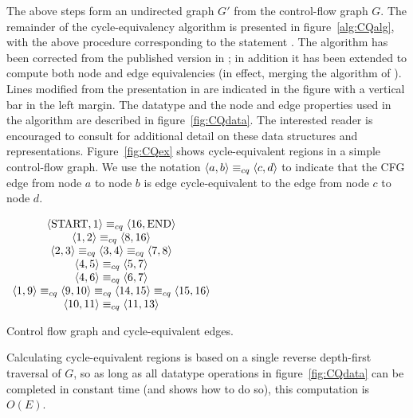\documentclass[12pt,titlepage,twoside]{article}
\begin{document}
The above steps form an undirected graph $G'$ from the control-flow
graph $G$.  The remainder of the cycle-equivalency algorithm is
presented in figure~\vref{alg:CQalg}, with the above procedure
corresponding to the statement .  The
algorithm has been corrected from the published version in
\cite{johnson93:sese}; in addition it has been extended to compute
both node and edge equivalencies (in effect, merging the algorithm of
\cite{johnson94:pst}).  Lines modified from the presentation in
\cite{johnson93:sese} are indicated in the figure with a vertical bar
in the left margin.  The datatype  and the node
and edge properties used in the algorithm are described in
figure~\vref{fig:CQdata}.  The interested reader is encouraged to consult
\cite{johnson93:sese} for additional detail on these data structures
and representations.%
Figure~\vref{fig:CQex} shows cycle-equivalent regions in a simple
control-flow graph.  We use the notation
$\left\langle a,b \right\rangle\equiv_{cq}\left\langle c,d \right\rangle$ to indicate that the CFG edge from node
$a$ to node $b$ is edge cycle-equivalent to the edge from node $c$ to
node $d$.

\begin{myfigure}\centering
\vertcenter{}
$\begin{array}[c]{cc}
\left\langle \text{START},1 \right\rangle\equiv_{cq}\left\langle 16,\text{END} \right\rangle\\
\left\langle 1,2 \right\rangle\equiv_{cq}\left\langle 8,16 \right\rangle\\
\left\langle 2,3 \right\rangle\equiv_{cq}\left\langle 3,4 \right\rangle\equiv_{cq}\left\langle 7,8 \right\rangle\\
\left\langle 4,5 \right\rangle\equiv_{cq}\left\langle 5,7 \right\rangle\\
\left\langle 4,6 \right\rangle\equiv_{cq}\left\langle 6,7 \right\rangle\\
\left\langle 1,9 \right\rangle\equiv_{cq}\left\langle 9,10 \right\rangle\equiv_{cq}\left\langle 14,15 \right\rangle\equiv_{cq}\left\langle 15,16 \right\rangle\\
\left\langle 10,11 \right\rangle\equiv_{cq}\left\langle 11,13 \right\rangle\\
\end{array}$
\caption{Control flow graph and cycle-equivalent edges.}
\label{fig:CQex}\end{myfigure}

Calculating cycle-equivalent regions is based on a single reverse
depth-first traversal of $G$, so as long as all datatype operations in
figure~\ref{fig:CQdata} can be completed in constant time (and
\cite{johnson93:sese} shows how to do so), this computation is $O(E)$.
\end{document}
